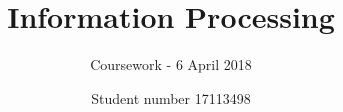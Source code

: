 \documentclass[runningheads]{llncs}
\begin{document}
%
\title{Information Processing}
\subtitle{Coursework - 6 April 2018}
%
%
\author{Student number 17113498 }
%
%
%
\maketitle              %







%
%
%


\end{document}
